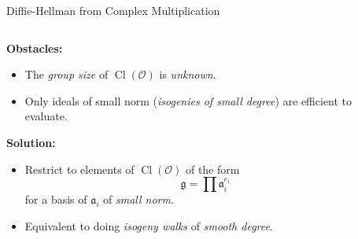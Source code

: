 \documentclass[aspectratio=169]{beamer}
\renewcommand{\O}{\mathcal{O}}
\newcommand{\Cl}{\operatorname{Cl}}
\renewcommand{\a}{\mathfrak{a}}
\newcommand{\g}{\mathfrak{g}}
\begin{document}
\begin{frame}{Diffie-Hellman from Complex Multiplication}
  \begin{columns}
    \begin{column}{0.6\textwidth}
      \textbf{Obstacles:}
      \begin{itemize}
      \item The \emph{group size} of $\Cl(\O)$ is \emph{unknown}.
      \item Only ideals of small norm (\emph{isogenies of small degree})
        are efficient to evaluate.
      \end{itemize}

      \textbf{Solution:}
      \begin{itemize}
      \item Restrict to elements of $\Cl(\O)$ of the form
        \[\g = \prod \a_i^{e_i}\]
        for a basis of $\a_i$ of \emph{small norm}.
      \item Equivalent to doing \emph{isogeny walks} of \emph{smooth
          degree}.
      \end{itemize}
    \end{column}
    \begin{column}{0.4\textwidth}
      \centering
    \end{column}
  \end{columns}
\end{frame}

\end{document}
